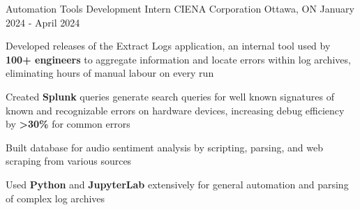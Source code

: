 

\begin{cventries}




	\cventry
	{Automation Tools Development Intern} %
	{CIENA Corporation} %
	{Ottawa, ON} %
	{January 2024 - April 2024} %
	{
		\begin{cvitems} %
			\item {Developed releases of the Extract Logs application, an internal tool used by \textbf{100+ engineers} to aggregate information and locate errors within log archives, eliminating hours of manual labour on every run}
			\item {Created \textbf{Splunk} queries generate search queries for well known signatures of known and recognizable errors on hardware devices, increasing debug efficiency by \textbf{>30\%} for common errors}
			\item {Built database for audio sentiment analysis by scripting, parsing, and web scraping from various sources}
			\item {Used \textbf{Python} and \textbf{JupyterLab} extensively for general automation and parsing of complex log archives}
		\end{cvitems}
	}


\end{cventries}
